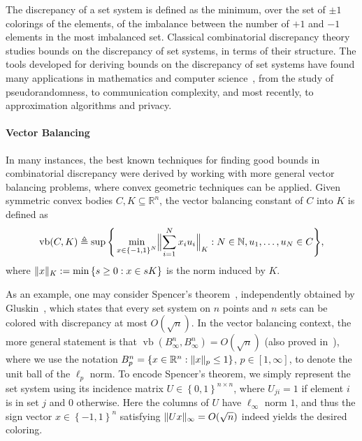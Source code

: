\documentclass[11pt]{article}
\newcommand{\R}{{\mathbb{R}}}
\newcommand{\eqdef}{\triangleq}
\newcommand{\set}[1]{\left\{ #1 \right\}}
\DeclareMathOperator{\vb}{vb}
\DeclarePairedDelimiter\norm{\lVert}{\rVert}
\begin{document}
The discrepancy of a set system is defined as the minimum, over the set of $\pm 1$ colorings of the elements, of the imbalance between the number of $+1$ and $-1$ elements in the most imbalanced set. Classical combinatorial discrepancy theory studies bounds on the discrepancy of set systems, in terms of their structure. 
The tools developed for deriving bounds on
the discrepancy of set systems have found many applications in mathematics and
computer science~\cite{Matousek,Chazelle}, from the study of pseudorandomness,
to communication complexity, and most recently, to approximation algorithms and privacy. 

\paragraph{\bf Vector Balancing} In many instances, the best known techniques for finding
good bounds in combinatorial discrepancy were derived by working with more
general vector balancing problems, where convex geometric techniques can be
applied. Given symmetric convex bodies $C,K \subseteq \R^n$, the vector
balancing constant of $C$ into $K$ is defined as 
\[
\vb(C, K) \eqdef \sup\Bigg\{ 
\min_{x \in \set{-1,1}^N} \Bigl\|\sum_{i = 1}^N x_i
u_i \Bigr\|_{K}: N \in \mathbb{N}, u_1, \ldots, u_N \in C \Bigg\},
\]
where $\norm{x}_K := \min \set{s \geq 0: x \in sK}$ is the norm induced by $K$.

As an example, one may consider Spencer's theorem~\cite{Spencer}, independently
obtained by Gluskin~\cite{gluskin}, which states that every set system on $n$
points and $n$ sets can be colored with discrepancy at most $O(\sqrt{n})$. In
the vector balancing context, the more general statement is that
$\vb(B_\infty^n,B_\infty^n) = O(\sqrt{n})$ (also proved
in~\cite{Spencer,gluskin}), where we use the notation $B_p^n = \set{x \in \R^n:
\norm{x}_p \leq 1}$, $p \in [1,\infty]$, to denote the unit ball of the $\ell_p$
norm. To encode Spencer's theorem, we simply represent the set system using its
incidence matrix $U \in \set{0,1}^{n \times n}$, where $U_{ji} = 1$ if element
$i$ is in set $j$ and $0$ otherwise. Here the columns of $U$ have $\ell_\infty$
norm $1$, and thus the sign vector $x \in \set{-1,1}^n$ satisfying $\norm{U
x}_\infty = O(\sqrt{n})$ indeed yields the desired coloring.   
\end{document}
